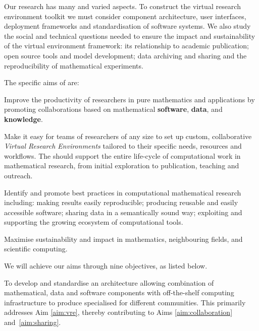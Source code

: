 \documentclass[noworkareas,deliverables,\classoptions]{euproposal}       %
\begin{document}
\begin{proposal}
Our research has many and varied aspects. To
construct the \TheProject virtual research environment toolkit we must
consider component architecture, user interfaces, deployment
frameworks and standardisation of software systems.  We also study
the social and technical questions needed to ensure the impact and sustainability of the
virtual environment framework: its relationship to academic publication; open source
tools and model development; data archiving and sharing and the reproducibility of
mathematical experiments.

The specific aims of \TheProject are:
\begin{compactenum}
\item \label{aim:collaboration} Improve the productivity of
  researchers in pure mathematics and applications by promoting
  collaborations based on mathematical \textbf{software},
  \textbf{data}, and \textbf{knowledge}.
\item \label{aim:vre} Make it easy for teams of researchers of any
  size to set up custom, collaborative \emph{Virtual Research
    Environments} tailored to their specific needs, resources and
  workflows. The \VREs should support the entire life-cycle of
  computational work in mathematical research, from initial
  exploration to publication, teaching and outreach.
\item \label{aim:sharing} Identify and promote best practices in
  computational mathematical research including: making results easily
  reproducible; producing reusable and easily accessible
  software; sharing data in a semantically sound way; exploiting and
  supporting the growing ecosystem of computational tools.
\item \label{aim:impact} Maximise sustainability and impact in
  mathematics, neighbouring fields, and scientific computing.
\end{compactenum}

We will achieve our aims through nine objectives, as listed below.

\begin{compactenum}
\item\label{objective:framework} To develop and standardise an
  architecture allowing combination of mathematical, data and software
  components with off-the-shelf computing infrastructure to produce
  specialised \VREs for different communities.
  This
  primarily addresses Aim \ref{aim:vre}, thereby contributing to Aims
  \ref{aim:collaboration} and~\ref{aim:sharing}. %


\end{compactenum}
\end{proposal}
\end{document}
